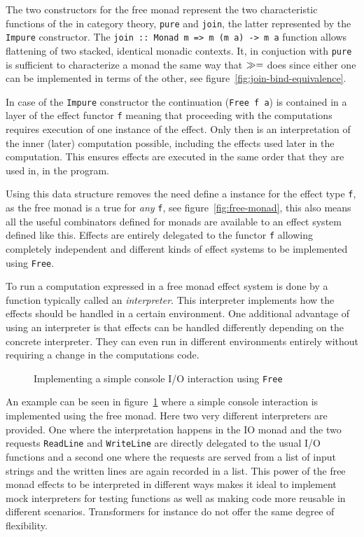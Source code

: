 The two constructors for the free monad represent the two characteristic
functions of the \Monad{} in category theory, \texttt{pure} and \texttt{join},
the latter represented by the \texttt{Impure} constructor. The \texttt{join ::
  Monad m => m (m a) -> m a} function allows flattening of two stacked,
identical monadic contexts. It, in conjuction with \texttt{pure} is sufficient
to characterize a monad the same way that $\gg=$ does since either one can be
implemented in terms of the other, see figure~\ref{fig:join-bind-equivalence}.

In case of the \texttt{Impure} constructor the continuation (\texttt{Free f a})
is contained in a layer of the effect functor \texttt{f} meaning that proceeding
with the computations requires execution of one instance of the effect. Only
then is an interpretation of the inner (later) computation possible, including
the effects used later in the computation. This ensures effects are executed in
the same order that they are used in, in the program.

Using this data structure removes the need define a \Monad{} instance for the
effect type \texttt{f}, as the free monad is a true \Monad{} for \emph{any}
\Functor{} \texttt{f}, see figure~\ref{fig:free-monad}, this also means all the
useful combinators defined for monads are available to an effect system defined
like this. Effects are entirely delegated to the functor \texttt{f} allowing
completely independent and different kinds of effect systems to be implemented
using \texttt{Free}.

To run a computation expressed in a free monad effect system is done by a
function typically called an \emph{interpreter}. This interpreter implements how
the effects should be handled in a certain environment. One additional advantage
of using an interpreter is that effects can be handled differently depending on
the concrete interpreter. They can even run in different environments entirely
without requiring a change in the computations code.

\begin{figure}
  
   \caption{Implementing a simple console I/O interaction using
    \texttt{Free}}
  \label{fig:console-io-example}
\end{figure}

An example can be seen in figure~\ref{fig:console-io-example} where a simple
console interaction is implemented using the free monad. Here two very different
interpreters are provided. One where the interpretation happens in the IO monad
and the two requests \texttt{ReadLine} and \texttt{WriteLine} are directly
delegated to the usual I/O functions and a second one where the requests are
served from a list of input strings and the written lines are again recorded in
a list. This power of the free monad effects to be interpreted in different ways
makes it ideal to implement mock interpreters for testing functions as well as
making code more reusable in different scenarios. Transformers for instance do
not offer the same degree of flexibility.

